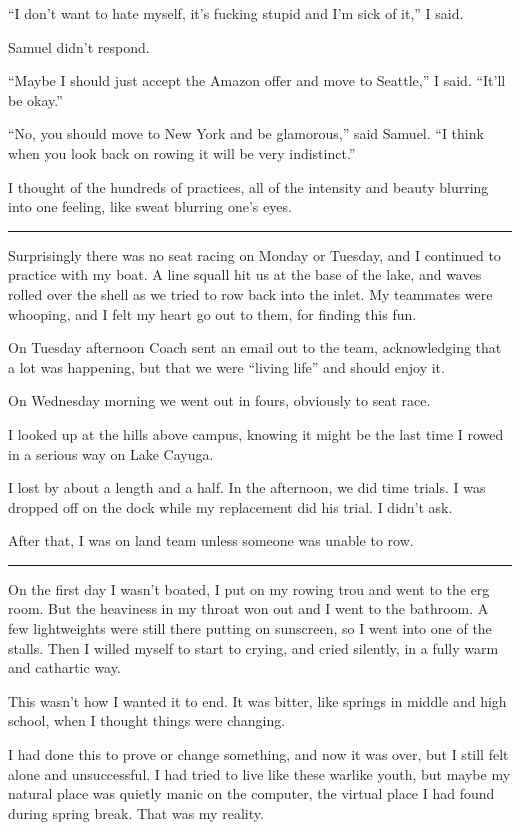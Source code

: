 ``I don't want to hate myself, it's fucking stupid and I'm sick of it,'' I said.  

Samuel didn't respond.

``Maybe I should just accept the Amazon offer and move to Seattle,'' I said.
``It'll be okay.''

``No, you should move to New York and be glamorous,'' said Samuel.  ``I think
when you look back on rowing it will be very indistinct.'' 

I thought of the hundreds of practices, all of the intensity and beauty blurring
into one feeling, like sweat blurring one's eyes.

\plainfancybreak{12pt}{2}{* * *}

Surprisingly there was no seat racing on Monday or Tuesday, and I continued to
practice with my boat.  A line squall hit us at the base of the lake, and waves
rolled over the shell as we tried to row back into the inlet.  My teammates were
whooping, and I felt my heart go out to them, for finding this fun.

On Tuesday afternoon Coach sent an email out to the team, acknowledging that a
lot was happening, but that we were ``living life'' and should enjoy it.

On Wednesday morning we went out in fours, obviously to seat race.

I looked up at the hills above campus, knowing it might be the last time I rowed
in a serious way on Lake Cayuga.  

I lost by about a length and a half.  In the afternoon, we did time trials.  I
was dropped off on the dock while my replacement did his trial.  I didn't ask.

After that, I was on land team unless someone was unable to row.
 
\plainfancybreak{12pt}{2}{* * *}

On the first day I wasn't boated, I put on my rowing trou and went to the erg
room.  But the heaviness in my throat won out and I went to the bathroom.  A few
lightweights were still there putting on sunscreen, so I went into one of the
stalls.  Then I willed myself to start to crying, and cried silently, in a fully
warm and cathartic way.  

This wasn't how I wanted it to end.  It was bitter, like springs in middle and
high school, when I thought things were changing.  

I had done this to prove or change something, and now it was over, but I still
felt alone and unsuccessful.  I had tried to live like these warlike youth, but
maybe my natural place was quietly manic on the computer, the virtual place I
had found during spring break.  That was my reality.

